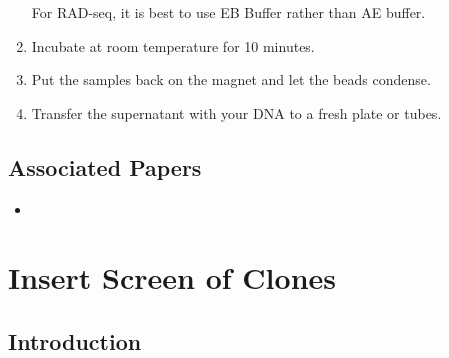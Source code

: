 \documentclass[
  letterpaper,
  DIV=11,
  numbers=noendperiod]{scrreprt}
\providecommand{\tightlist}{%
  \setlength{\itemsep}{0pt}\setlength{\parskip}{0pt}}\usepackage{longtable,booktabs,array}
\begin{document}
\begin{enumerate}
  \begin{tcolorbox}[enhanced jigsaw, toprule=.15mm, breakable, coltitle=black, leftrule=.75mm, title=\textcolor{quarto-callout-warning-color}{\faExclamationTriangle}\hspace{0.5em}{NOTE}, bottomrule=.15mm, toptitle=1mm, bottomtitle=1mm, colframe=quarto-callout-warning-color-frame, opacityback=0, colback=white, opacitybacktitle=0.6, colbacktitle=quarto-callout-warning-color!10!white, rightrule=.15mm, titlerule=0mm, arc=.35mm, left=2mm]

  For RAD-seq, it is best to use EB Buffer rather than AE buffer.

  \end{tcolorbox}
\item
  Incubate at room temperature for 10 minutes.
\item
  Put the samples back on the magnet and let the beads condense.
\item
  Transfer the supernatant with your DNA to a fresh plate or tubes.
\end{enumerate}

\hypertarget{associated-papers-13}{%
\section{Associated Papers}\label{associated-papers-13}}

\begin{itemize}
\tightlist
\item
\end{itemize}

\hypertarget{sec-molecular-clone_insert_screen}{%
\chapter{Insert Screen of
Clones}\label{sec-molecular-clone_insert_screen}}

\hypertarget{introduction-21}{%
\section{Introduction}\label{introduction-21}}
\end{document}
